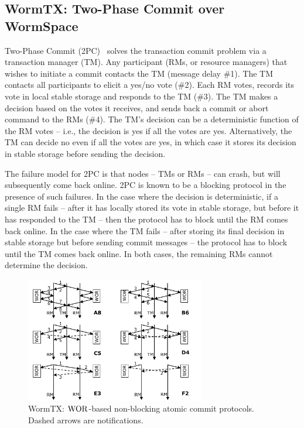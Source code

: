 \subsection{WormTX: Two-Phase Commit over WormSpace}
\label{chapter:wormspace:subsec:wormtx}

Two-Phase Commit (2PC)~\cite{distsys} solves the transaction commit problem via a transaction manager (TM). 
Any participant (RMs, or resource managers) that wishes to initiate a commit contacts the TM (message delay \#1). 
The TM contacts all participants to elicit a yes/no vote (\#2). Each RM votes, records its vote in local stable storage and responds to the TM (\#3). 
The TM makes a decision based on the votes it receives, and sends back a commit or abort command to the RMs (\#4). 
The TM's decision can be a deterministic function of the RM votes -- i.e., the decision is yes if all the votes are yes. 
Alternatively, the TM can decide no even if all the votes are yes, in which case it stores its decision in stable storage before sending the decision.

The failure model for 2PC is that nodes -- TMs or RMs -- can crash, but will subsequently come back online. 
2PC is known to be a blocking protocol in the presence of such failures. In the case where the decision is deterministic, 
if a single RM fails -- after it has locally stored its vote in stable storage, but before it has responded to the 
TM -- then the protocol has to block until the RM comes back online. In the case where the TM fails --
 after storing its final decision in stable storage but before sending commit messages -- 
 the protocol has to block until the TM comes back online. In both cases, the remaining RMs cannot determine the decision. 



\begin{figure}
\centering
\includegraphics[width=0.7\textwidth]{figs/multipaxos/pics-2pc}
\caption{WormTX: $\mathrm{WOR}$-based non-blocking atomic commit protocols. Dashed arrows are notifications. \label{fig:commit}}
\end{figure}


